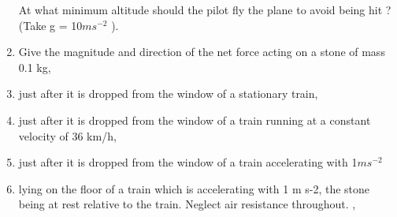 \begin{enumerate}[label=\arabic*.,ref=\thesubsection.\theenumi]
At what minimum  altitude should the pilot fly the plane to avoid being hit ? (Take g = 10$ m s^{-2}$
).
\item Give the magnitude and direction of the net force acting on a stone of mass 0.1 kg, 
\item  just after it is dropped from the window of a stationary train, 
\item  just after it is dropped from the window of a train running at a constant velocity of 36 km/h,
\item  just after it is dropped from the window of a train accelerating with 1$ m s^{-2} $
\item  lying on the floor of a train which is accelerating with 1 m s-2, the stone being at rest relative to the train.
Neglect air resistance throughout. , 
\end{enumerate}
